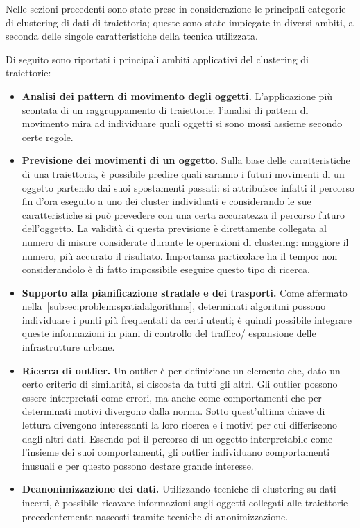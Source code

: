 Nelle sezioni precedenti sono state prese in considerazione le principali categorie di clustering di dati di traiettoria; queste sono state impiegate in
diversi ambiti, a seconda delle singole caratteristiche della tecnica utilizzata.

Di seguito sono riportati i principali ambiti applicativi del clustering di traiettorie:

\begin{itemize}

  \item \textbf{Analisi dei pattern di movimento degli oggetti.}
  L'applicazione più scontata di un raggruppamento di traiettorie: l'analisi di pattern di
  movimento mira ad individuare quali oggetti si sono mossi assieme secondo certe regole.

  \item \textbf{Previsione dei movimenti di un oggetto.}
  Sulla base delle caratteristiche di una traiettoria, è possibile predire quali saranno
  i futuri movimenti di un oggetto partendo dai suoi spostamenti passati: si attribuisce infatti
  il percorso fin d'ora eseguito a uno dei cluster individuati e considerando le sue caratteristiche
  si può prevedere con una certa accuratezza il percorso futuro dell'oggetto.
  La validità di questa previsione è direttamente collegata al numero di misure considerate durante
  le operazioni di clustering: maggiore il numero, più accurato il risultato.
  Importanza particolare ha il tempo: non considerandolo è di fatto impossibile eseguire questo tipo
  di ricerca.

  \item \textbf{Supporto alla pianificazione stradale e dei trasporti.}
  Come affermato nella~\cref{subsec:problem:spatialalgorithms}, determinati algoritmi
  possono individuare i punti più frequentati da certi utenti; è quindi possibile integrare queste
  informazioni in piani di controllo del traffico/ espansione delle infrastrutture urbane.

  \item \textbf{Ricerca di outlier.}
  Un outlier è per definizione un elemento che, dato un certo criterio di similarità,
  si discosta da tutti gli altri. Gli outlier possono essere interpretati come errori, ma anche
  come comportamenti che per determinati motivi divergono dalla norma.
  Sotto quest'ultima chiave di lettura divengono interessanti la loro ricerca e i motivi per cui
  differiscono dagli altri dati.
  Essendo poi il percorso di un oggetto interpretabile come l'insieme dei suoi comportamenti,
  gli outlier individuano comportamenti inusuali e per questo possono destare grande interesse.

  \item \textbf{Deanonimizzazione dei dati.}
  Utilizzando tecniche di clustering su dati incerti, è possibile ricavare informazioni sugli
  oggetti collegati alle traiettorie precedentemente nascosti tramite tecniche di anonimizzazione.

\end{itemize}


